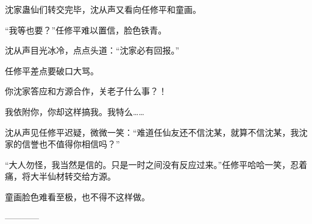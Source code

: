 \begin{this_body}
沈家蛊仙们转交完毕，沈从声又看向任修平和童画。

“我等也要？”任修平难以置信，脸色铁青。

沈从声目光冰冷，点点头道：“沈家必有回报。”

任修平差点要破口大骂。

你沈家答应和方源合作，关老子什么事？！

我依附你，你却这样搞我。我特么……

沈从声见任修平迟疑，微微一笑：“难道任仙友还不信沈某，就算不信沈某，我沈家的信誉也不值得你相信吗？”

“大人勿怪，我当然是信的。只是一时之间没有反应过来。”任修平哈哈一笑，忍着痛，将大半仙材转交给方源。

童画脸色难看至极，也不得不这样做。

------------

\end{this_body}

